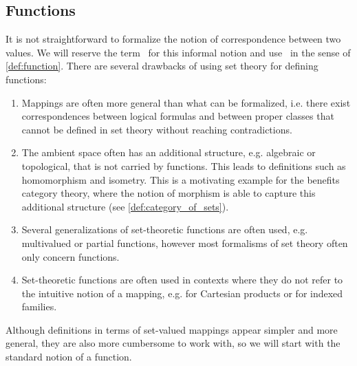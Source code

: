 \subsection{Functions}\label{subsec:functions}

\begin{remark}\label{remark:function_definition}
  It is not straightforward to formalize the notion of correspondence between two values. We will reserve the term~ for this informal notion and use~ in the sense of \cref{def:function}. There are several drawbacks of using set theory for defining functions:
  \begin{enumerate}
    \item Mappings are often more general than what can be formalized, i.e. there exist correspondences between logical formulas and between proper classes that cannot be defined in set theory without reaching contradictions.
    \item The ambient space often has an additional structure, e.g. algebraic or topological, that is not carried by functions. This leads to definitions such as homomorphism and isometry. This is a motivating example for the benefits category theory, where the notion of morphism is able to capture this additional structure (see \cref{def:category_of_sets}).
    \item Several generalizations of set-theoretic functions are often used, e.g. multivalued or partial functions, however most formalisms of set theory often only concern functions.
    \item Set-theoretic functions are often used in contexts where they do not refer to the intuitive notion of a mapping, e.g. for Cartesian products or for indexed families.
  \end{enumerate}

  Although definitions in terms of set-valued mappings appear simpler and more general, they are also more cumbersome to work with, so we will start with the standard notion of a function.
\end{remark}

